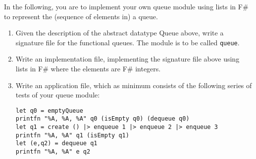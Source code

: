 In the following, you are to implement your own queue module using lists in F\# to represent the (sequence of elements in) a queue.
\begin{enumerate}
\item Given the description of the abstract datatype Queue above, write a signature file for the functional queues.  The module is to be called \lstinline{queue}.
\item Write an implementation file, implementing the signature file above using lists in F\# where the elements are F\# integers.
\item Write an application file, which as minimum consists of the following series of tests of your queue module:
\begin{lstlisting}
let q0 = emptyQueue
printfn "%A, %A, %A" q0 (isEmpty q0) (dequeue q0)
let q1 = create () |> enqueue 1 |> enqueue 2 |> enqueue 3
printfn "%A, %A" q1 (isEmpty q1)
let (e,q2) = dequeue q1
printfn "%A, %A" e q2
\end{lstlisting}
\end{enumerate}
